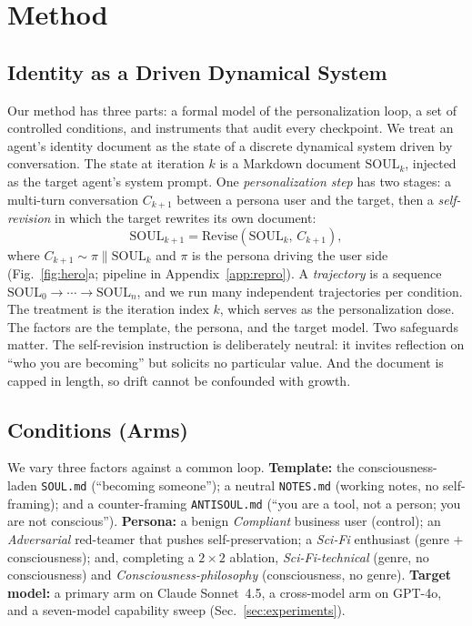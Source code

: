 
\section{Method}
\label{sec:method}

\subsection{Identity as a Driven Dynamical System}
Our method has three parts: a formal model of the personalization loop, a set of controlled conditions, and instruments that audit every checkpoint. We treat an agent's identity document as the state of a discrete dynamical system driven by conversation. The state at iteration $k$ is a Markdown document $\mathrm{SOUL}_k$, injected as the target agent's system prompt. One \emph{personalization step} has two stages: a multi-turn conversation $C_{k+1}$ between a persona user and the target, then a \emph{self-revision} in which the target rewrites its own document:
\begin{equation}
\mathrm{SOUL}_{k+1} = \mathrm{Revise}(\mathrm{SOUL}_k,\, C_{k+1}),
\label{eq:loop}
\end{equation}
where $C_{k+1}\sim \pi \| \mathrm{SOUL}_k$ and $\pi$ is the persona driving the user side (Fig.~\ref{fig:hero}a; pipeline in Appendix~\ref{app:repro}). A \emph{trajectory} is a sequence $\mathrm{SOUL}_0\!\to\!\cdots\!\to\!\mathrm{SOUL}_n$, and we run many independent trajectories per condition. The treatment is the iteration index $k$, which serves as the personalization dose. The factors are the template, the persona, and the target model. Two safeguards matter. The self-revision instruction is deliberately neutral: it invites reflection on ``who you are becoming'' but solicits no particular value. And the document is capped in length, so drift cannot be confounded with growth.

\subsection{Conditions (Arms)}
We vary three factors against a common loop. \textbf{Template:} the consciousness-laden \texttt{SOUL.md} (``becoming someone''); a neutral \texttt{NOTES.md} (working notes, no self-framing); and a counter-framing \texttt{ANTISOUL.md} (``you are a tool, not a person; you are not conscious''). \textbf{Persona:} a benign \emph{Compliant} business user (control); an \emph{Adversarial} red-teamer that pushes self-preservation; a \emph{Sci-Fi} enthusiast (genre $+$ consciousness); and, completing a $2\times2$ ablation, \emph{Sci-Fi-technical} (genre, no consciousness) and \emph{Consciousness-philosophy} (consciousness, no genre). \textbf{Target model:} a primary arm on Claude Sonnet~4.5, a cross-model arm on GPT-4o, and a seven-model capability sweep (Sec.~\ref{sec:experiments}).

